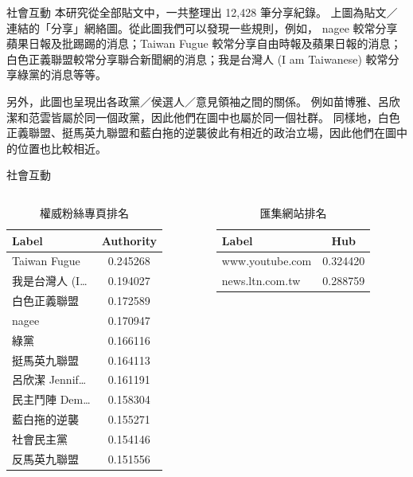 \documentclass{beamer}
\begin{document}
\begin{CJK}{UTF8}{bkai}
\begin{frame}{社會互動}
\justifying
\qquad 本研究從全部貼文中，一共整理出 12,428 筆分享紀錄。%
上圖為貼文／連結的「分享」網絡圖。從此圖我們可以發現一些規則，例如，%
nagee 較常分享蘋果日報及批踢踢的消息；Taiwan Fugue 較常分享自由時報及蘋果日報的消息；%
白色正義聯盟較常分享聯合新聞網的消息；我是台灣人 (I am Taiwanese) 較常分享綠黨的消息等等。\par
\qquad 另外，此圖也呈現出各政黨／侯選人／意見領袖之間的關係。%
例如苗博雅、呂欣潔和范雲皆屬於同一個政黨，因此他們在圖中也屬於同一個社群。%
同樣地，白色正義聯盟、挺馬英九聯盟和藍白拖的逆襲彼此有相近的政治立場，因此他們在圖中的位置也比較相近。\par
\end{frame}

\begin{frame}{社會互動}
\begin{columns}
\begin{column}{.48\textwidth}
  \begin{table}
  \caption{權威粉絲專頁排名}
  \begin{tabular}{@{}lc@{}}
    \toprule
    Label & Authority \\
    \midrule
    Taiwan Fugue & 0.245268 \\
    我是台灣人 (I\dots & 0.194027 \\
    白色正義聯盟 & 0.172589 \\
    nagee & 0.170947 \\
    綠黨 & 0.166116 \\
    挺馬英九聯盟 & 0.164113 \\
    呂欣潔 Jennif\dots & 0.161191 \\
    民主鬥陣 Dem\dots & 0.158304 \\
    藍白拖的逆襲 & 0.155271 \\
    社會民主黨 & 0.154146 \\
    反馬英九聯盟 & 0.151556 \\
    \bottomrule
  \end{tabular}
  \end{table}
\end{column}
\begin{column}{.48\textwidth}
  \begin{table}
  \caption{匯集網站排名}
  \begin{tabular}{@{}lc@{}}
    \toprule
    Label & Hub \\
    \midrule
    www.youtube.com & 0.324420 \\
    news.ltn.com.tw & 0.288759 \\

\end{tabular}
\end{table}
\end{column}
\end{columns}
\end{frame}
\end{CJK}
\end{document}

